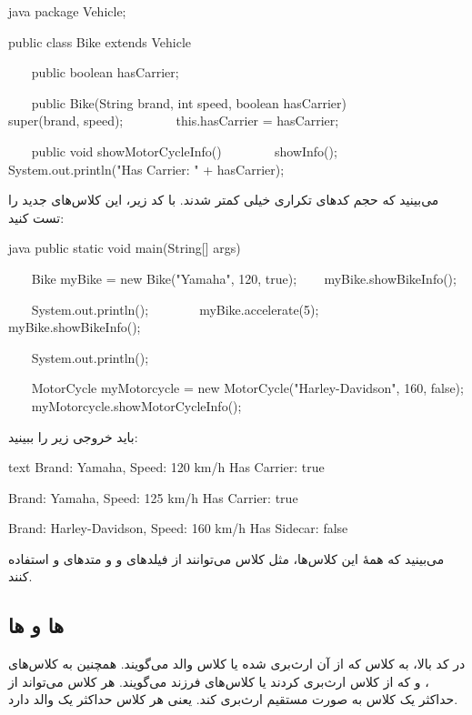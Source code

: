 \begin{codebox}{java}
package Vehicle;

public class Bike extends Vehicle {
    public boolean hasCarrier;

    public Bike(String brand, int speed, boolean hasCarrier) {
        super(brand, speed);
        this.hasCarrier = hasCarrier;  
    }

    public void showMotorCycleInfo() {  
        showInfo();  
        System.out.println("Has Carrier: " + hasCarrier);  
    }  
}
\end{codebox}

می‌بینید که حجم کدهای تکراری خیلی کمتر شدند. با کد زیر، این کلاس‌های جدید
را تست کنید:

\begin{codebox}{java}
public static void main(String[] args) {  
    Bike myBike = new Bike("Yamaha", 120, true);  
    myBike.showBikeInfo();  
  
    System.out.println();  
      
    myBike.accelerate(5);  
    myBike.showBikeInfo();

    System.out.println();  
  
    MotorCycle myMotorcycle = new MotorCycle("Harley-Davidson", 160, false);  
    myMotorcycle.showMotorCycleInfo();  
}
\end{codebox}

باید خروجی زیر را ببینید:

\begin{codebox}{text}
Brand: Yamaha, Speed: 120 km/h  
Has Carrier: true  
  
Brand: Yamaha, Speed: 125 km/h  
Has Carrier: true  
  
Brand: Harley-Davidson, Speed: 160 km/h  
Has Sidecar: false
\end{codebox}

می‌بینید که همهٔ این کلاس‌ها، مثل کلاس  می‌توانند از فیلدهای
 و  و متدهای
 و  استفاده کنند.

\subsection{ ها و  ها}

در کد بالا، به کلاس  که از آن ارث‌بری شده
 یا کلاس والد می‌گویند. همچنین به کلاس‌های
 ،  و  که از
کلاس  ارث‌بری کردند  یا کلاس‌های فرزند
می‌گویند. هر کلاس می‌تواند از حداکثر یک کلاس به صورت مستقیم ارث‌بری کند.
یعنی هر کلاس حداکثر یک والد دارد.

